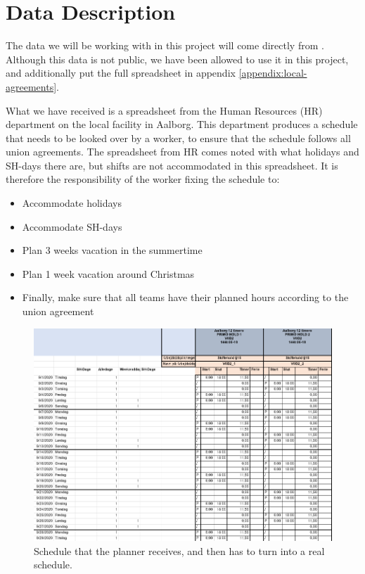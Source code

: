\section{Data Description} \label{section:datadesc}
The data we will be working with in this project will come directly from \siemens. Although this data is not public, we have been allowed to use it in this project, and additionally put the full spreadsheet in appendix \ref{appendix:local-agreements}.

What we have received is a spreadsheet from the Human Resources (HR) department on the local \siemens facility in Aalborg. This department produces a schedule that needs to be looked over by a worker, to ensure that the schedule follows all union agreements. The spreadsheet from HR comes noted with what holidays and SH-days there are, but shifts are not accommodated in this spreadsheet. It is therefore the responsibility of the worker fixing the schedule to:

\begin{itemize}
    \item Accommodate holidays
    \item Accommodate SH-days
    \item Plan 3 weeks vacation in the summertime
    \item Plan 1 week vacation around Christmas
    \item Finally, make sure that all teams have their planned hours according to the union agreement
\end{itemize}

\begin{figure}[ht!]
    \centering
    \includegraphics[width=\textwidth]{media/Schedule WO fix.png}
    \caption{Schedule that the planner receives, and then has to turn into a real schedule.}
    \label{fig:Schedule no fix}
\end{figure}

